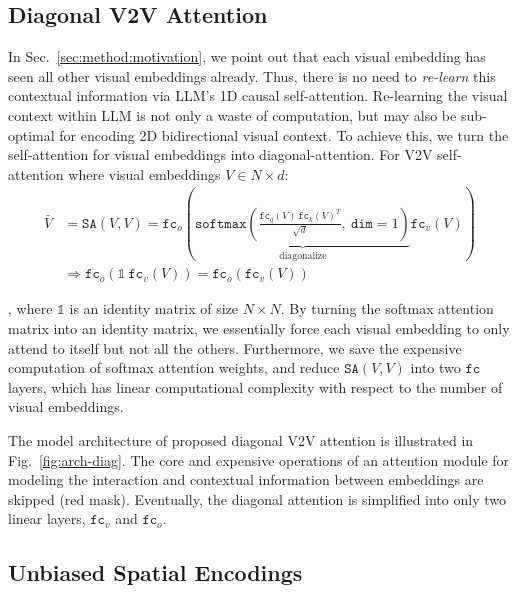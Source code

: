\subsection{Diagonal V2V Attention}\label{sec:method:diag-attn}

In Sec.~\ref{sec:method:motivation}, we point out that each visual embedding has seen all other visual embeddings already.
Thus, there is no need to \emph{re-learn} this contextual information via LLM's 1D causal self-attention.
Re-learning the visual context within LLM is not only a waste of computation, but may also be sub-optimal for encoding 2D bidirectional visual context.
To achieve this, we turn the self-attention for visual embeddings into diagonal-attention.
For V2V self-attention where visual embeddings $V \in N\times d$:
\begin{align}
\bar{V} &= \texttt{SA}(V, V) = \texttt{fc}_o\left( \underbrace{\texttt{softmax}\left( \frac{\texttt{fc}_q(V)\ \texttt{fc}_k(V)^T}{\sqrt{d}},\ \texttt{dim}=1\right)}_{\text{diagonalize} }\texttt{fc}_v(V) \right)\\
&\Rightarrow \texttt{fc}_o\left(\mathds{1}\ \texttt{fc}_v(V) \right) =  \texttt{fc}_o\left(\texttt{fc}_v(V) \right)
\end{align}

, where $\mathds{1}$ is an identity matrix of size $N\times N$.
By turning the softmax attention matrix into an identity matrix, we essentially force each visual embedding to only attend to itself but not all the others.
Furthermore, we save the expensive computation of softmax attention weights, and reduce $\texttt{SA}(V, V)$ into two $\texttt{fc}$ layers, which has linear computational complexity with respect to the number of visual embeddings.

The model architecture of proposed diagonal V2V attention is illustrated in Fig.~\ref{fig:arch-diag}.
The core and expensive operations of an attention module for modeling the interaction and contextual information between embeddings are skipped (red mask).
Eventually, the diagonal attention is simplified into only two linear layers, $\texttt{fc}_v$ and $\texttt{fc}_o$.

\subsection{Unbiased Spatial Encodings}\label{sec:method:pos-enc}

